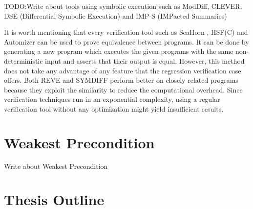 TODO:Write about tools using symbolic execution such as ModDiff, CLEVER, DSE (Differential Symbolic Execution) and IMP-S (IMPacted Summaries)

It is worth mentioning that every verification tool such as SeaHorn \cite{DBLP:conf/cav/GurfinkelKKN15}, HSF(C) \cite{DBLP:conf/tacas/GrebenshchikovGLPR12} and Automizer \cite{DBLP:conf/cav/HeizmannHP13} can be used to prove equivalence between programs. It can be done by generating a new program which executes the given programs with the same non-deterministic input and asserts that their output is equal. However, this method does not take any advantage of any feature that the regression verification case offers. Both REVE and SYMDIFF perform better on closely related programs because they exploit the similarity to reduce the computational overhead. Since verification techniques run in an exponential complexity, using a regular verification tool without any optimization might yield insufficient results. 

\section{Weakest Precondition}
\label{sec:wp}
Write about Weakest Precondition \cite{10.1145/360933.360975}

\section{Thesis Outline}

